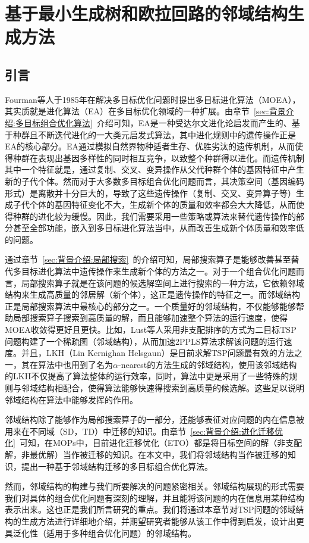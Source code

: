 \chapter{基于最小生成树和欧拉回路的邻域结构生成方法}
\label{chap:NS_Method}

\section{引言}
\label{sec:NS_Method:引言}
Fourman等人于1985年在解决多目标优化问题时提出多目标进化算法（MOEA）\cite{fourman1985compaction,schaffer1985multiple}，其实质就是进化算法（EA）在多目标优化领域的一种扩展。由章节~\ref{sec:背景介绍:多目标组合优化算法}~介绍可知，EA是一种受达尔文进化论启发而产生的、基于种群且不断迭代进化的一大类元启发式算法，其中进化规则中的遗传操作正是EA的核心部分。EA通过模拟自然界物种适者生存、优胜劣汰的遗传机制，从而使得种群在表现出基因多样性的同时相互竞争，以致整个种群得以进化。而遗传机制其中一个特征就是，通过复制、交叉、变异操作从父代种群个体的基因特征中产生新的子代个体。然而对于大多数多目标组合优化问题而言，其决策空间（基因编码形式）是离散并十分巨大的，导致了这些遗传操作（复制、交叉、变异算子等）生成子代个体的基因特征变化不大，生成新个体的质量和效率都会大大降低，从而使得种群的进化较为缓慢。因此，我们需要采用一些策略或算法来替代遗传操作的部分甚至全部功能，嵌入到多目标进化算法当中，从而改善生成新个体质量和效率低的问题。
\par
通过章节~\ref{sec:背景介绍:局部搜索}~的介绍可知，局部搜索算子是能够改善甚至替代多目标进化算法中遗传操作来生成新个体的方法之一。对于一个组合优化问题而言，局部搜索算子就是在该问题的候选解空间上进行搜索的一种方法，它依赖邻域结构来生成高质量的邻居解（新个体），这正是遗传操作的特征之一。而邻域结构正是局部搜索算法中最核心的部分之一。一个质量好的邻域结构，不仅能够能够帮助局部搜索算子搜索到高质量的解，而且能够加速整个算法的运行速度，使得MOEA收敛得更好且更快。比如，Lust等人\cite{lust2010speed}采用非支配排序的方式为二目标TSP问题构建了一个稀疏图（邻域结构），从而加速2PPLS\cite{lust2010two}算法求解该问题的运行速度。并且，LKH（Lin Kernighan Helsgaun）\cite{helsgaun2000effective}是目前求解TSP问题最有效的方法之一，其在算法中也用到了名为$\alpha$-nearest\cite{held1970traveling,held1971traveling}的方法生成的邻域结构，使用该邻域结构的LKH不仅提高了算法整体的运行效率，同时，算法中更是采用了一些特殊的规则与邻域结构相配合，使得算法能够快速得搜索到高质量的候选解。这些足以说明邻域结构在算法中能够发挥的作用。
\par
邻域结构除了能够作为局部搜索算子的一部分，还能够表征对应问题的内在信息被用来在不同域（SD，TD）中迁移的知识。由章节~\ref{sec:背景介绍:进化迁移优化}~可知，在MOPs中，目前进化迁移优化（ETO）都是将目标空间的解（非支配解，非最优解）当作被迁移的知识。在本文中，我们将邻域结构当作被迁移的知识，提出一种基于邻域结构迁移的多目标组合优化算法。
\par
然而，邻域结构的构建与我们所要解决的问题紧密相关。邻域结构展现的形式需要我们对具体的组合优化问题有深刻的理解，并且能将该问题的内在信息用某种结构表示出来。这也正是我们所言研究的重点。我们将通过本章节对TSP问题的邻域结构的生成方法进行详细地介绍，并期望研究者能够从该工作中得到启发，设计出更具泛化性（适用于多种组合优化问题）的邻域结构。

